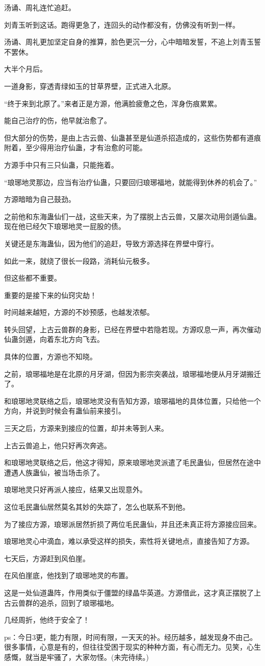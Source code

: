 \begin{this_body}
汤诵、周礼连忙追赶。

刘青玉听到这话。跑得更急了，连回头的动作都没有，仿佛没有听到一样。

汤诵、周礼更加坚定自身的推算，脸色更沉一分，心中暗暗发誓，不追上刘青玉誓不罢休。

大半个月后。

一道身影，穿透青绿如玉的甘草界壁，正式进入北原。

“终于来到北原了。”来者正是方源，他满脸疲惫之色，浑身伤痕累累。

能自己治疗的伤，他早就治愈了。

但大部分的伤势，是由上古云兽、仙蛊甚至是仙道杀招造成的，这些伤势都有道痕附着，至少得用治疗仙蛊，才有治愈的可能。

方源手中只有三只仙蛊，只能拖着。

“琅琊地灵那边，应当有治疗仙蛊，只要回归琅琊福地，就能得到休养的机会了。”

方源暗暗为自己鼓劲。

之前他和东海蛊仙们一战，这些天来，为了摆脱上古云兽，又屡次动用剑遁仙蛊。现在他已经欠下琅琊地灵一屁股的债。

关键还是东海蛊仙，因为他们的追赶，导致方源选择在界壁中穿行。

如此一来，就绕了很长一段路，消耗仙元极多。

但这些都不重要。

重要的是接下来的仙窍灾劫！

时间越来越短，方源的不妙预感，也越发浓郁。

转头回望，上古云兽群的身影，已经在界壁中若隐若现。方源叹息一声，再次催动仙蛊剑遁，向着东北方向飞去。

具体的位置，方源也不知晓。

之前，琅琊福地是在北原的月牙湖，但因为影宗突袭战，琅琊福地便从月牙湖搬迁了。

和琅琊地灵联络之后，琅琊地灵没有告知方源，琅琊福地的具体位置，只给他一个方向，并说到时候会有蛊仙前来接引。

三天之后，方源来到接应的位置，却并未等到人来。

上古云兽追上，他只好再次奔逃。

和琅琊地灵联络之后，他这才得知，原来琅琊地灵派遣了毛民蛊仙，但居然在途中遭遇人族蛊仙，被当场击杀了。

琅琊地灵只好再派人接应，结果又出现意外。

这位毛民蛊仙居然莫名其妙的失踪了，怎么也联系不到他。

为了接应方源，琅琊派居然折损了两位毛民蛊仙，并且还未真正将方源接应回来。

琅琊地灵心中滴血，难以承受这样的损失，索性将关键地点，直接告知了方源。

七天后，方源赶到风伯崖。

在风伯崖底，他找到了琅琊地灵的布置。

这是一处仙道蛊阵，作用类似于僵盟的绿晶华英道。方源借此，这才真正摆脱了上古云兽群的追杀，回到了琅琊福地。

几经周折，他终于安全了！

ps：今日3更，能力有限，时间有限，一天天的补。经历越多，越发现身不由己。很多事情，心意是有的，但往往受困于现实的种种方面，有心而无力。见笑，心生感慨，就当是牢骚了，大家勿怪。(未完待续。)

\end{this_body}

